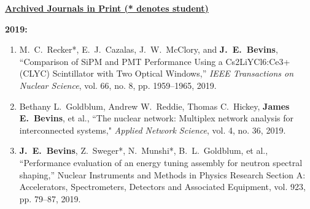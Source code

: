 \underline{\textbf{Archived Journals in Print (* denotes student)}}

\textbf{2019:}
\begin{enumerate}
  \item M.\ C.\ Recker*, E.\ J.\ Cazalas, J.\ W.\ McClory, and \textbf{J.\ E.\ Bevins}, ``Comparison of SiPM and PMT Performance Using a Cs2LiYCl6:Ce3+(CLYC) Scintillator with Two Optical Windows,” \textit{IEEE Transactions on Nuclear Science}, vol. 66, no. 8, pp. 1959–1965, 2019.

  \item Bethany L.\ Goldblum, Andrew W.\ Reddie, Thomas C.\ Hickey, \textbf{James E.\ Bevins}, et al., ``The nuclear network: Multiplex network analysis for interconnected systems," \textit{Applied Network Science}, vol. 4, no. 36, 2019.
  
   \item \textbf{J.\ E.\ Bevins}, Z.\ Sweger*, N.\ Munshi*, B.\ L.\ Goldblum, et al., ``Performance evaluation of an energy tuning assembly for neutron spectral shaping,” Nuclear Instruments and Methods in Physics Research Section A: Accelerators, Spectrometers, Detectors and Associated Equipment, vol. 923, pp. 79–87, 2019.
\end{enumerate}

